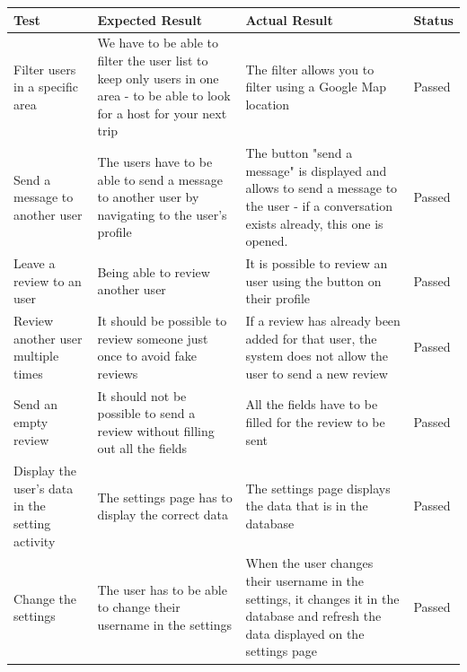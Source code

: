 \documentclass[paper=a4, fontsize=12pt,DIV=14]{scrartcl}    %
\begin{document}
			\begin{tabular}{|p{4.3cm}|p{4.3cm}|p{4.3cm}|p{2cm}|}
	            \hline
                \textbf{Test}& \textbf{Expected Result} & \textbf{Actual Result} & \textbf{Status} \\
                \hline
                \hline
                Filter users in a specific area
                & We have to be able to filter the user list to keep only users in one area - to be able to look for a host for your next trip
                & The filter allows you to filter using a Google Map location
                & Passed\\
                \hline
                Send a message to another user
                & The users have to be able to send a message to another user by navigating to the user's profile
                & The button "send a message" is displayed and allows to send a message to the user - if a conversation exists already, this one is opened.
                & Passed\\
                \hline
                Leave a review to an user
                & Being able to review another user
                & It is possible to review an user using the button on their profile
                & Passed\\
                \hline
                Review another user multiple times
                & It should be possible to review someone just once to avoid fake reviews
                & If a review has already been added for that user, the system does not allow the user to send a new review
                & Passed\\
                \hline
                Send an empty review 
                & It should not be possible to send a review without filling out all the fields
                & All the fields have to be filled for the review to be sent
                & Passed\\
                \hline
                Display the user's data in the setting activity
                & The settings page has to display the correct data
                & The settings page displays the data that is in the database
                & Passed\\
                \hline
                Change the settings
                & The user has to be able to change their username in the settings
                & When the user changes their username in the settings, it changes it in the database and refresh the data displayed on the settings page
                & Passed\\

\end{tabular}
\end{document}
